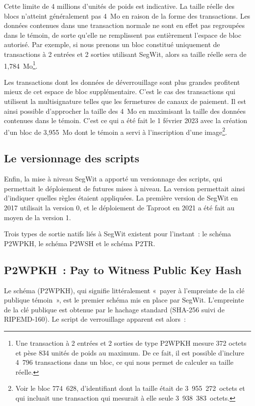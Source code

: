 Cette limite de 4 millions d'unités de poids est indicative. La taille réelle des blocs n'atteint généralement pas 4~Mo en raison de la forme des transactions. Les données contenues dans une transaction normale ne sont en effet pas regroupées dans le témoin, de sorte qu'elle ne remplissent pas entièrement l'espace de bloc autorisé. Par exemple, si nous prenons un bloc constitué uniquement de transactions à 2 entrées et 2 sorties utilisant SegWit, alors sa taille réelle sera de 1,784~Mo\footnote{Une transaction à 2 entrées et 2 sorties de type P2WPKH mesure 372 octets et pèse 834 unités de poids au maximum. De ce fait, il est possible d'inclure 4~796 transactions dans un bloc, ce qui nous permet de calculer sa taille réelle.}.

Les transactions dont les données de déverrouillage sont plus grandes profitent mieux de cet espace de bloc supplémentaire. C'est le cas des transactions qui utilisent la multisignature telles que les fermetures de canaux de paiement. Il est ainsi possible d'approcher la taille des 4~Mo en maximisant la taille des données contenues dans le témoin. C'est ce qui a été fait le 1\ier{} février 2023 avec la création d'un bloc de 3,955~Mo dont le témoin a servi à l'inscription d'une image\footnote{Voir le bloc 774~628, d'identifiant  dont la taille était de 3~955~272~octets et qui incluait une transaction qui mesurait à elle seule 3~938~383~octets.}.


\subsection{Le versionnage des scripts} Enfin, la mise à niveau SegWit a apporté un versionnage des scripts, qui permettait le déploiement de futures mises à niveau. La version permettait ainsi d'indiquer quelles règles étaient appliquées. La première version de SegWit en 2017 utilisait la version 0, et le déploiement de Taproot en 2021 a été fait au moyen de la version 1.


Trois types de sortie natifs liés à SegWit existent pour l'instant~: le schéma P2WPKH, le schéma P2WSH et le schéma P2TR.

\subsection{P2WPKH~: Pay to Witness Public Key Hash} Le schéma  (P2WPKH), qui signifie littéralement «~payer à l'empreinte de la clé publique témoin~», est le premier schéma mis en place par SegWit. L'empreinte de la clé publique est obtenue par le hachage standard (SHA-256 suivi de RIPEMD-160). Le script de verrouillage apparent est alors~:

